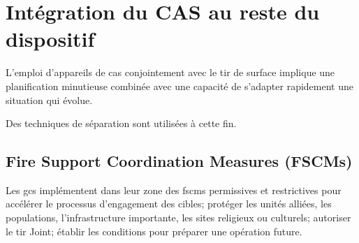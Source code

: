 \section{Intégration du CAS au reste du dispositif}

L'emploi d'appareils de \gls{cas} conjointement avec le tir de surface implique une planification minutieuse combinée avec une capacité de s'adapter rapidement une situation qui évolue.\par

Des techniques de séparation sont utilisées à cette fin.

\subsection{Fire Support Coordination Measures (FSCMs)}
	Les \glspl{gc} implémentent dans leur zone des \glspl{fscm} permissives et restrictives pour accélérer le processus d'engagement des cibles; protéger les unités alliées, les populations, l'infrastructure importante, les sites religieux ou culturels; autoriser le tir Joint; établir les conditions pour préparer une opération future.
	
